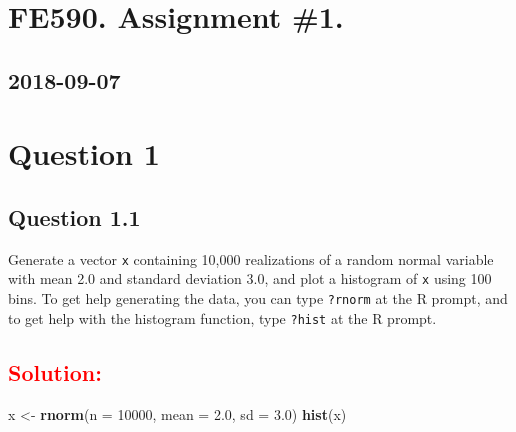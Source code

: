 \documentclass[]{article}
\title{}
\author{}
\date{}
\newenvironment{Shaded}{\begin{snugshade}}{\end{snugshade}}
\newcommand{\KeywordTok}[1]{\textcolor[rgb]{0.13,0.29,0.53}{\textbf{#1}}}
\newcommand{\DataTypeTok}[1]{\textcolor[rgb]{0.13,0.29,0.53}{#1}}
\newcommand{\DecValTok}[1]{\textcolor[rgb]{0.00,0.00,0.81}{#1}}
\newcommand{\FloatTok}[1]{\textcolor[rgb]{0.00,0.00,0.81}{#1}}
\newcommand{\StringTok}[1]{\textcolor[rgb]{0.31,0.60,0.02}{#1}}
\newcommand{\CommentTok}[1]{\textcolor[rgb]{0.56,0.35,0.01}{\textit{#1}}}
\newcommand{\OperatorTok}[1]{\textcolor[rgb]{0.81,0.36,0.00}{\textbf{#1}}}
\newcommand{\NormalTok}[1]{#1}
\begin{document}
\section{FE590. Assignment \#1.}\label{fe590.-assignment-1.}

\subsection{2018-09-07}\label{section}

\section{Question 1}\label{question-1}

\subsection{Question 1.1}\label{question-1.1}

\begin{Shaded}
\end{Shaded}

Generate a vector \texttt{x} containing 10,000 realizations of a random
normal variable with mean 2.0 and standard deviation 3.0, and plot a
histogram of \texttt{x} using 100 bins. To get help generating the data,
you can type \texttt{?rnorm} at the R prompt, and to get help with the
histogram function, type \texttt{?hist} at the R prompt.

\subsection{\texorpdfstring{\textcolor{red}{Solution:}}{}}\label{section-1}

\begin{Shaded}
\begin{Highlighting}[]
\NormalTok{x <-}\StringTok{ }\KeywordTok{rnorm}\NormalTok{(}\DataTypeTok{n =} \DecValTok{10000}\NormalTok{, }\DataTypeTok{mean =} \FloatTok{2.0}\NormalTok{, }\DataTypeTok{sd =} \FloatTok{3.0}\NormalTok{)}
\KeywordTok{hist}\NormalTok{(x)}
\end{Highlighting}
\end{Shaded}
\end{document}
